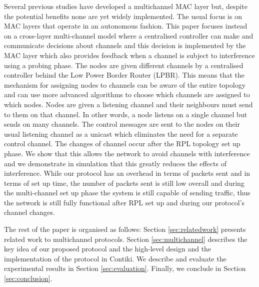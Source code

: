 Several previous studies have developed a multichannel MAC layer but, despite the potential benefits none are yet widely implemented. The usual focus
is on MAC layers that operate in an autonomous fashion.  This paper focuses instead on a cross-layer multi-channel model where a centralised controller can make and communicate decisions about channels and this decision is implemented by the MAC layer which also provides feedback when a channel is subject to interference using a probing phase. The nodes are given different channels by a centralised controller behind the Low Power Border Router (LPBR). This means that the mechanism for assigning nodes to channels can be aware of the entire topology and can use more advanced algorithms to choose which channels are assigned to which nodes. Nodes are given a listening channel and their neighbours must send to them on
that channel. In other words, a node listens on a single channel but sends on many channels.
The control messages are sent to the nodes on their usual listening channel as a unicast which eliminates the need for a separate control channel.
The changes of channel occur after the RPL topology set up phase. We show that this allows the network to avoid channels with interference and we
demonstrate in simulation that this greatly reduces the effects of interference. While our protocol has an overhead in terms of packets sent and in terms of set up time, the number of packets sent is still low overall and during the multi-channel set up phase the system is still capable of
sending traffic, thus the network is still fully functional after RPL set up and during our protocol's channel changes.

The rest of the paper is organised as follows: Section \ref{sec:relatedwork} presents related work to multichannel protocols. Section \ref{sec:multichannel} describes the key idea of our proposed protocol and the high-level design and the implementation of the protocol in Contiki. We describe and evaluate the experimental results in Section \ref{sec:evaluation}. Finally, we conclude in Section \ref{sec:conclusion}.

%
